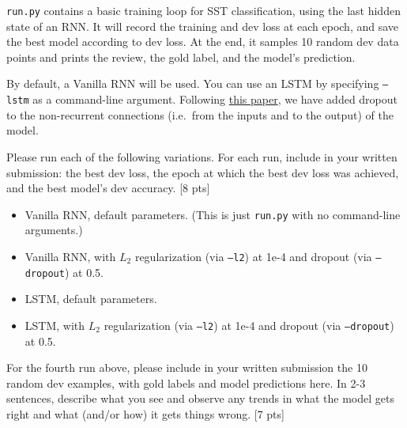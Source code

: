 \documentclass[11pt]{article}
\begin{document}
\texttt{run.py} contains a basic training loop for SST classification, using the last hidden state of an RNN. It will record the training and dev loss at each epoch, and save the best model according to dev loss.  At the end, it samples 10 random dev data points and prints the review, the gold label, and the model's prediction.

\vspace{2em}
 By default, a Vanilla RNN will be used.  You can use an LSTM by specifying \texttt{--lstm} as a command-line argument.  Following \href{https://arxiv.org/abs/1409.2329}{this paper}, we have added dropout to the non-recurrent connections (i.e.\ from the inputs and to the output) of the model.

\noindent Please run each of the following variations.  For each run, include in your written submission: the best dev loss, the epoch at which the best dev loss was achieved, and the best model's dev accuracy. \hfill [8 pts]
\begin{itemize}
  \item Vanilla RNN, default parameters.  (This is just \texttt{run.py} with no command-line arguments.)
  \item Vanilla RNN, with $L_2$ regularization (via \texttt{--l2}) at 1e-4 and dropout (via \texttt{--dropout}) at 0.5.
  \item LSTM, default parameters. 
  \item LSTM, with $L_2$ regularization (via \texttt{--l2}) at 1e-4 and dropout (via \texttt{--dropout}) at 0.5.
\end{itemize}

\vspace{2em}
 For the fourth run above, please include in your written submission the 10 random dev examples, with gold labels and model predictions here.  In 2-3 sentences, describe what you see and observe any trends in what the model gets right and what (and/or how) it gets things wrong. \hfill [7 pts]
\end{document}
